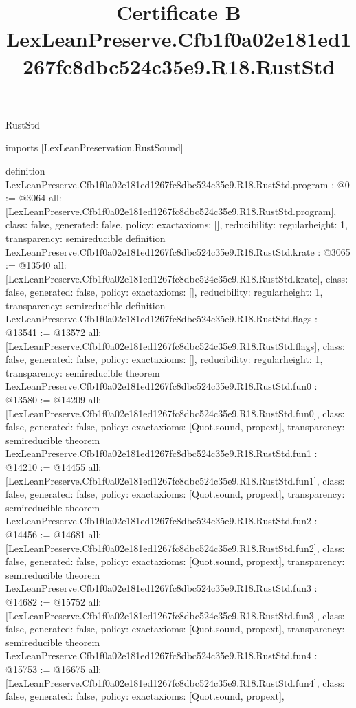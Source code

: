 \begin{lexlean}{RustStd}
\title{Certificate B LexLeanPreserve.Cfb1f0a02e181ed1267fc8dbc524c35e9.R18.RustStd}
\begin{coremodule}
imports [LexLeanPreservation.RustSound]

definition LexLeanPreserve.Cfb1f0a02e181ed1267fc8dbc524c35e9.R18.RustStd.program : @0 := @3064 {
  all: [LexLeanPreserve.Cfb1f0a02e181ed1267fc8dbc524c35e9.R18.RustStd.program],
  class: false,
  generated: false,
  policy: exact{axioms: []},
  reducibility: regular{height: 1},
  transparency: semireducible
}
definition LexLeanPreserve.Cfb1f0a02e181ed1267fc8dbc524c35e9.R18.RustStd.krate : @3065 := @13540 {
  all: [LexLeanPreserve.Cfb1f0a02e181ed1267fc8dbc524c35e9.R18.RustStd.krate],
  class: false,
  generated: false,
  policy: exact{axioms: []},
  reducibility: regular{height: 1},
  transparency: semireducible
}
definition LexLeanPreserve.Cfb1f0a02e181ed1267fc8dbc524c35e9.R18.RustStd.flags : @13541 := @13572 {
  all: [LexLeanPreserve.Cfb1f0a02e181ed1267fc8dbc524c35e9.R18.RustStd.flags],
  class: false,
  generated: false,
  policy: exact{axioms: []},
  reducibility: regular{height: 1},
  transparency: semireducible
}
theorem LexLeanPreserve.Cfb1f0a02e181ed1267fc8dbc524c35e9.R18.RustStd.fun0 : @13580 := @14209 {
  all: [LexLeanPreserve.Cfb1f0a02e181ed1267fc8dbc524c35e9.R18.RustStd.fun0],
  class: false,
  generated: false,
  policy: exact{axioms: [Quot.sound, propext]},
  transparency: semireducible
}
theorem LexLeanPreserve.Cfb1f0a02e181ed1267fc8dbc524c35e9.R18.RustStd.fun1 : @14210 := @14455 {
  all: [LexLeanPreserve.Cfb1f0a02e181ed1267fc8dbc524c35e9.R18.RustStd.fun1],
  class: false,
  generated: false,
  policy: exact{axioms: [Quot.sound, propext]},
  transparency: semireducible
}
theorem LexLeanPreserve.Cfb1f0a02e181ed1267fc8dbc524c35e9.R18.RustStd.fun2 : @14456 := @14681 {
  all: [LexLeanPreserve.Cfb1f0a02e181ed1267fc8dbc524c35e9.R18.RustStd.fun2],
  class: false,
  generated: false,
  policy: exact{axioms: [Quot.sound, propext]},
  transparency: semireducible
}
theorem LexLeanPreserve.Cfb1f0a02e181ed1267fc8dbc524c35e9.R18.RustStd.fun3 : @14682 := @15752 {
  all: [LexLeanPreserve.Cfb1f0a02e181ed1267fc8dbc524c35e9.R18.RustStd.fun3],
  class: false,
  generated: false,
  policy: exact{axioms: [Quot.sound, propext]},
  transparency: semireducible
}
theorem LexLeanPreserve.Cfb1f0a02e181ed1267fc8dbc524c35e9.R18.RustStd.fun4 : @15753 := @16675 {
  all: [LexLeanPreserve.Cfb1f0a02e181ed1267fc8dbc524c35e9.R18.RustStd.fun4],
  class: false,
  generated: false,
  policy: exact{axioms: [Quot.sound, propext]},
}
\end{coremodule}
\end{lexlean}
